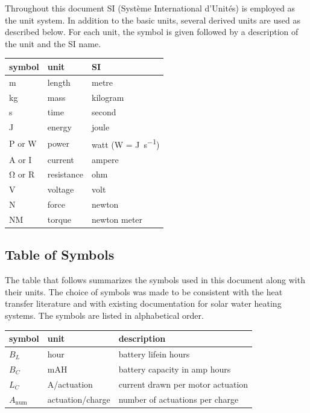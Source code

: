 \documentclass[12pt]{article}
\begin{document}
Throughout this document SI (Syst\`{e}me International d'Unit\'{e}s) is employed
as the unit system.  In addition to the basic units, several derived units are
used as described below.  For each unit, the symbol is given followed by a
description of the unit and the SI name.
~\newline

\renewcommand{\arraystretch}{1.2}
  \noindent \begin{tabular}{l l l} 
    \toprule		
    \textbf{symbol} & \textbf{unit} & \textbf{SI}\\
    \midrule 
    \si{\metre} & length & metre\\
    \si{\kilogram} & mass	& kilogram\\
    \si{\second} & time & second\\
    \si{\joule} & energy & joule\\
    P or \si{\watt} & power & watt (W = \si{\joule\per\second})\\
    \si{\ampere} or I& current & ampere\\
    \si{\ohm} or R& resistance & ohm\\
    \si{\volt} & voltage & volt\\
    \si{\newton} & force & newton\\
    \si{\newton}M & torque & newton meter\\
    \bottomrule
  \end{tabular}

\subsection{Table of Symbols}

The table that follows summarizes the symbols used in this document along with
their units.  The choice of symbols was made to be consistent with the heat
transfer literature and with existing documentation for solar water heating
systems.  The symbols are listed in alphabetical order.

\renewcommand{\arraystretch}{1.2}
\noindent \begin{longtable*}{l l p{12cm}} \toprule
\textbf{symbol} & \textbf{unit} & \textbf{description}\\
\midrule 
$B_L$ & hour & battery lifein hours\\
$B_C$ & mAH & battery capacity in amp hours\\
$L_C$ & A/actuation & current drawn per motor actuation\\
$A_\text{num}$ & actuation/charge & number of actuations per charge\\ 
\bottomrule
\end{longtable*}
\end{document}
